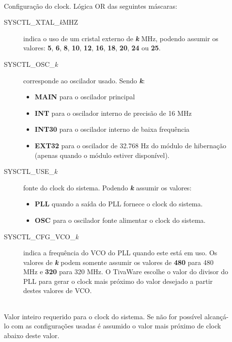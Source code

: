 \begin{description}
	\item []\hfill \\
	Configuração do clock. Lógica OR das seguintes máscaras:
	\begin{description}
		\item [SYSCTL\_XTAL\_\emph{k}MHZ] indica o uso de um cristal externo de \textbf{\emph{k}} MHz, podendo assumir os valores: \textbf{5}, \textbf{6}, \textbf{8}, \textbf{10}, \textbf{12}, \textbf{16}, \textbf{18}, \textbf{20}, \textbf{24} ou \textbf{25}.
		
		\item [SYSCTL\_OSC\_\emph{k}] corresponde ao oscilador usado. Sendo \textbf{\emph{k}}:
		\begin{itemize}
			\item \textbf{MAIN} para o oscilador principal
			\item \textbf{INT} para o oscilador interno de precisão de 16 MHz
			\item \textbf{INT30} para o oscilador interno de baixa frequência
			\item \textbf{EXT32} para o oscilador de 32.768 Hz do módulo de hibernação (apenas quando o módulo estiver disponível).
		\end{itemize}
		
		\item [SYSCTL\_USE\_\emph{k}] fonte do clock do sistema. Podendo \textbf{\emph{k}} assumir os valores:
		\begin{itemize}
			\item \textbf{PLL} quando a saída do PLL fornece o clock do sistema.
			\item \textbf{OSC} para o oscilador fonte alimentar o clock do sistema.
		\end{itemize}
		
		\item [SYSCTL\_CFG\_VCO\_\emph{k}] indica a frequência do VCO do PLL quando este está em uso. Os valores de \textbf{\emph{k}} podem somente assumir os valores de \textbf{480} para 480 MHz e \textbf{320} para 320 MHz. O TivaWare escolhe o valor do divisor do PLL para gerar o clock mais próximo do valor desejado a partir destes valores de VCO.
	\end{description}
	
	\item []\hfill \\
	Valor inteiro requerido para o clock do sistema. Se não for possível alcançá-lo com as configurações usadas é assumido o valor mais próximo de clock abaixo deste valor.
\end{description}

